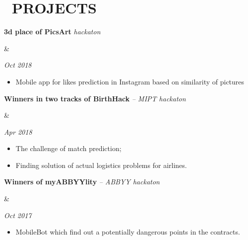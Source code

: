 \documentclass[11pt,a4paper,roman]{moderncv}
\newcommand*{\cvhack}[3]{
    \parbox[t]{0.78\textwidth}{
    {\bfseries #2} {\itshape #3}
    }&\parbox[t]{0.22\textwidth}{
    \hfill {\itshape #1}}
}
\begin{document}
\section{\faRocket~PROJECTS}
\cvhack{Oct 2018}
        {3d place of PicsArt}
        {hackaton}
\begin{itemize}
    \item Mobile app for likes prediction in Instagram based on similarity of pictures
\end{itemize}

\cvhack{Apr 2018}
        {Winners in two tracks of BirthHack}
        {-- MIPT hackaton}
\begin{itemize}
    \item The challenge of match prediction;
    \item Finding solution of actual logistics problems for airlines.
\end{itemize}

\cvhack{Oct 2017}
        {Winners of myABBYYlity}
        {-- ABBYY hackaton}
\begin{itemize}
    \item MobileBot which find out a potentially dangerous points in the contracts.
\end{itemize}
\end{document}
